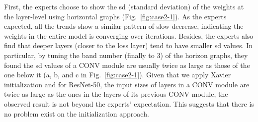 \documentclass[format=acmsmall, review=false, screen=true]{acmart}
\makeatletter
\newcommand{\dy}{\textcolor[rgb]{0,0,0}}
\newcommand\footnoteref[1]{\protected@xdef\@thefnmark{\ref{#1}}\@footnotemark}
\makeatother
\begin{document}
First, the experts choose to show the sd (standard deviation) of the weights at the layer-level using horizontal graphs (Fig.~\ref{fig:case2-1}).
As the experts expected, all the trends show a similar pattern of slow decrease, indicating the weights in the entire model is converging over iterations.
Besides, the experts also find that deeper layers (closer to the loss layer) tend to have smaller sd values.
\dy{In particular, by tuning the band number (finally to 3) of the horizon graphs, they found the sd values of a CONV module are usually twice as large as those of the one below it (a, b, and c in Fig.~\ref{fig:case2-1}).
Given that we apply Xavier initialization\footnoteref{note7} and for ResNet-50, the input sizes of layers in a CONV module are twice as large as the ones in the layers of its previous CONV module, the observed result is not beyond the experts' expectation. This suggests that there is no problem exist on the initialization approach.
}%
\end{document}
